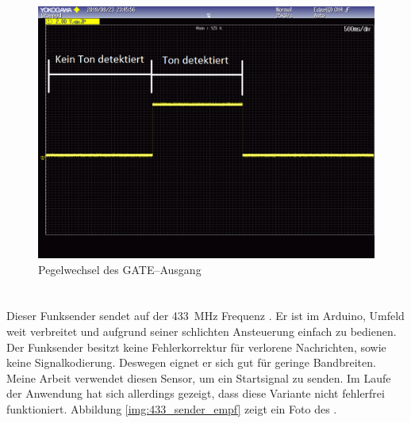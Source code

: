 \begin{figure}[H]
        \centering
        \includegraphics[width=1\textwidth]{images/gate_ausgang.png}
        \caption{Pegelwechsel des \si{GATE}--Ausgang}
        \label{img:gate_ausgang}
\end{figure}

\paragraph{\funkempfaenger}\mbox{}\\
Dieser Funksender sendet auf der \SI{433}{\mega \hertz} Frequenz \cite{src_433_FUNKSENDER}. Er ist im Arduino, Umfeld weit verbreitet und aufgrund seiner schlichten Ansteuerung einfach zu bedienen. Der Funksender besitzt keine Fehlerkorrektur für verlorene Nachrichten, sowie keine Signalkodierung. Deswegen eignet er sich gut für geringe Bandbreiten. Meine Arbeit verwendet diesen Sensor, um ein Startsignal zu senden. Im Laufe der Anwendung hat sich allerdings gezeigt, dass diese Variante nicht fehlerfrei funktioniert. Abbildung \ref{img:433_sender_empf} zeigt ein Foto des \funkempfaenger.

